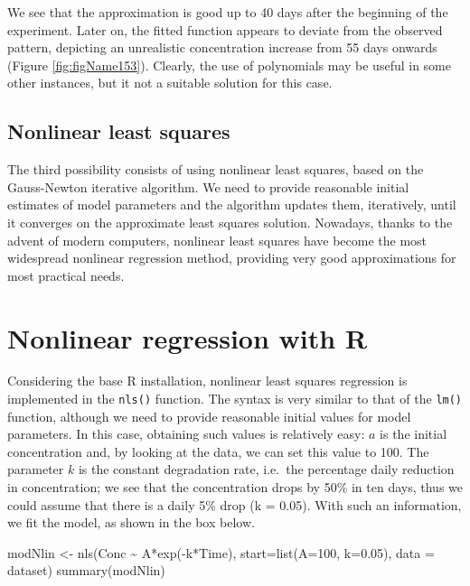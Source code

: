 \documentclass[a4paper,12pt,oneside]{book}
\newenvironment{Shaded}{\begin{snugshade}}{\end{snugshade}}
\newcommand{\DecValTok}[1]{#1}
\newcommand{\FloatTok}[1]{#1}
\newcommand{\SpecialCharTok}[1]{#1}
\newcommand{\OtherTok}[1]{#1}
\newcommand{\FunctionTok}[1]{#1}
\newcommand{\AttributeTok}[1]{#1}
\newcommand{\NormalTok}[1]{#1}
\begin{document}
We see that the approximation is good up to 40 days after the beginning of the experiment. Later on, the fitted function appears to deviate from the observed pattern, depicting an unrealistic concentration increase from 55 days onwards (Figure \ref{fig:figName153}). Clearly, the use of polynomials may be useful in some other instances, but it not a suitable solution for this case.

\hypertarget{nonlinear-least-squares}{%
\subsection{Nonlinear least squares}\label{nonlinear-least-squares}}

The third possibility consists of using nonlinear least squares, based on the Gauss-Newton iterative algorithm. We need to provide reasonable initial estimates of model parameters and the algorithm updates them, iteratively, until it converges on the approximate least squares solution. Nowadays, thanks to the advent of modern computers, nonlinear least squares have become the most widespread nonlinear regression method, providing very good approximations for most practical needs.

\hypertarget{nonlinear-regression-with-r}{%
\section{Nonlinear regression with R}\label{nonlinear-regression-with-r}}

Considering the base R installation, nonlinear least squares regression is implemented in the \texttt{nls()} function. The syntax is very similar to that of the \texttt{lm()} function, although we need to provide reasonable initial values for model parameters. In this case, obtaining such values is relatively easy: \(a\) is the initial concentration and, by looking at the data, we can set this value to 100. The parameter \(k\) is the constant degradation rate, i.e.~the percentage daily reduction in concentration; we see that the concentration drops by 50\% in ten days, thus we could assume that there is a daily 5\% drop (k = 0.05). With such an information, we fit the model, as shown in the box below.

\begin{Shaded}
\begin{Highlighting}[]
\NormalTok{modNlin }\OtherTok{\textless{}{-}} \FunctionTok{nls}\NormalTok{(Conc }\SpecialCharTok{\textasciitilde{}}\NormalTok{ A}\SpecialCharTok{*}\FunctionTok{exp}\NormalTok{(}\SpecialCharTok{{-}}\NormalTok{k}\SpecialCharTok{*}\NormalTok{Time), }
               \AttributeTok{start=}\FunctionTok{list}\NormalTok{(}\AttributeTok{A=}\DecValTok{100}\NormalTok{, }\AttributeTok{k=}\FloatTok{0.05}\NormalTok{), }
               \AttributeTok{data =}\NormalTok{ dataset)}
\FunctionTok{summary}\NormalTok{(modNlin)}
\end{Highlighting}
\end{Shaded}
\end{document}
